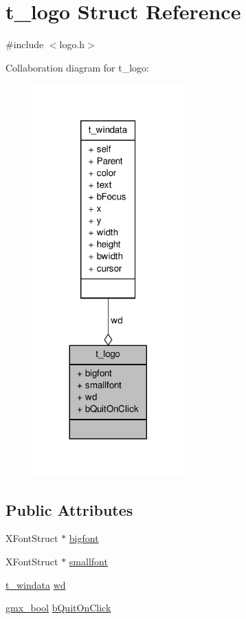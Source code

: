 \hypertarget{structt__logo}{\section{t\-\_\-logo \-Struct \-Reference}
\label{structt__logo}
}


{\ttfamily \#include $<$logo.\-h$>$}



\-Collaboration diagram for t\-\_\-logo\-:
\nopagebreak
\begin{figure}[H]
\begin{center}
\leavevmode
\includegraphics[width=164pt]{structt__logo__coll__graph}
\end{center}
\end{figure}
\subsection*{\-Public \-Attributes}
\begin{DoxyCompactItemize}
\item 
\-X\-Font\-Struct $\ast$ \hyperlink{structt__logo_a1fa9e046b5dbd1c5de1b3297288e40f1}{bigfont}
\item 
\-X\-Font\-Struct $\ast$ \hyperlink{structt__logo_a862092136a00b37787a2516686bc8d30}{smallfont}
\item 
\hyperlink{structt__windata}{t\-\_\-windata} \hyperlink{structt__logo_a859db98f8a9bebb75c1065743d1362a6}{wd}
\item 
\hyperlink{include_2types_2simple_8h_a8fddad319f226e856400d190198d5151}{gmx\-\_\-bool} \hyperlink{structt__logo_afa3816d42a9bbbd31aba1246350bc0ed}{b\-Quit\-On\-Click}
\end{DoxyCompactItemize}


